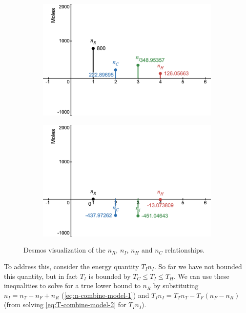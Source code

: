 \documentclass{article}
\begin{document}
\begin{figure}
    \begin{center}
        \begin{subfigure}{0.49\linewidth}
            \includegraphics[width=.95\linewidth]{./images/desmos-example-2-1.png}
        \end{subfigure}
        \begin{subfigure}{0.49\linewidth}
            \includegraphics[width=.95\linewidth]{./images/desmos-example-2-2.png}
        \end{subfigure}
    \end{center}
    \caption{Desmos visualization of the $n_R$, $n_I$, $n_H$ and $n_C$ relationships.}
    \label{fig:desmos-2}
\end{figure}

To address this, consider the energy quantity $T_I n_I$. So far we have not bounded this quantity,
but in fact $T_I$ is bounded by $T_C\le T_I\le T_H$. We can use these inequalities to solve for
a true lower bound to $n_R$ by substituting $n_I=n_T-n_F+n_R$ (\cref{eq:n-combine-model-1})
and $T_I n_I=T_T n_T-T_F(n_F-n_R)$ (from solving \cref{eq:T-combine-model-2} for $T_I n_I$).
\end{document}
